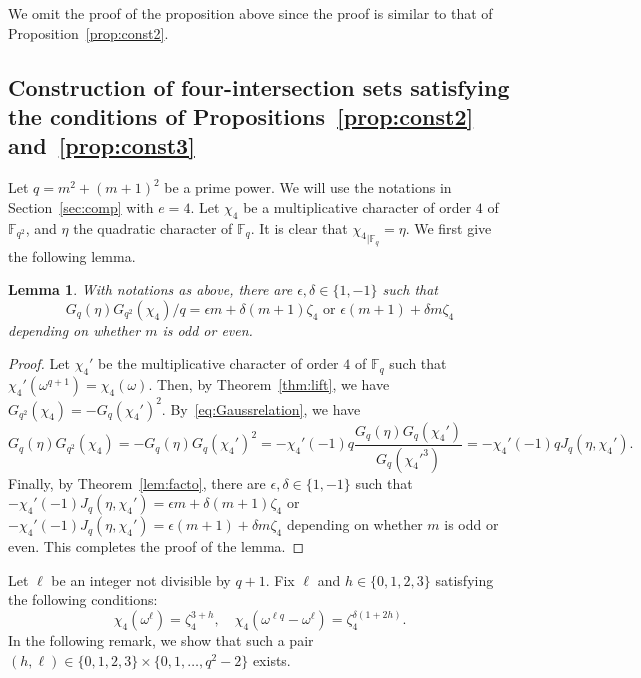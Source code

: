 \documentclass[10pt]{amsart}
\newtheorem{lemm}[theo]{Lemma}
\theoremstyle{definition}
\newcommand*\F{{\mathbb F}}
\begin{document}
We omit the proof of the proposition above since the proof is similar to that of Proposition~\ref{prop:const2}.

\subsection{Construction of four-intersection sets satisfying the conditions of Propositions~\ref{prop:const2} and~\ref{prop:const3}}\label{sec:5.2}

Let $q=m^2+(m+1)^2$ be a prime power. We will use the notations in Section~\ref{sec:comp} with $e=4$. Let $\chi_4$ be a multiplicative character of order $4$ of $\F_{q^2}$, and $\eta$ the quadratic character of $\F_{q}$. It is clear that ${\chi_4}_{|\F_q}=\eta$. We first give the following lemma.

\begin{lemm}\label{lem:Gaussconst}
With notations as above, there are $\epsilon,\delta\in \{1,-1\}$ such that
\[
G_q(\eta)G_{q^2}(\chi_4)/q=\epsilon m+\delta (m+1)\zeta_4 \mbox{ or } \epsilon (m+1)+\delta m \zeta_4
\]
depending on whether $m$ is odd or even.
\end{lemm}

\begin{proof}
Let $\chi_4'$ be the multiplicative character of order $4$ of $\F_q$ such that $\chi_4'(\omega^{q+1})=\chi_4(\omega)$. Then, by Theorem~\ref{thm:lift}, we have $ G_{q^2}(\chi_4)=-G_q(\chi_4')^2$. By~\eqref{eq:Gaussrelation}, we have
\[
G_q(\eta)G_{q^2}(\chi_4)=-G_q(\eta)G_{q}(\chi_4')^2=-\chi_4'(-1)q\frac{G_q(\eta)G_{q}(\chi_4')}{G_{q}(\chi_4'^3)}= -\chi_4'(-1)qJ_q(\eta,\chi_4').
\]
Finally, by Theorem~\ref{lem:facto}, there are $\epsilon,\delta\in \{1,-1\}$ such that $-\chi_4'(-1)J_q(\eta,\chi_4')=\epsilon m+\delta (m+1)\zeta_4$ or $-\chi_4'(-1)J_q(\eta,\chi_4')=\epsilon (m+1)+\delta m \zeta_4$ depending on whether $m$ is odd or even. This completes the proof of the lemma.
\end{proof}

Let $\ell$ be an integer not divisible by $q+1$. Fix $\ell$ and $h\in \{0,1,2,3\}$ satisfying the following conditions:
\begin{equation}\label{eq:cond24RR}
\chi_4(\omega^{\ell})=\zeta_4^{3+h}, \quad
\chi_4(\omega^{\ell q}-\omega^{\ell})=\zeta_4^{\delta (1+2h)}.
\end{equation}
In the following remark, we show that such a pair $(h,\ell)\in \{0,1,2,3\}\times \{0,1,\ldots,q^2-2\}$ exists.
\end{document}
